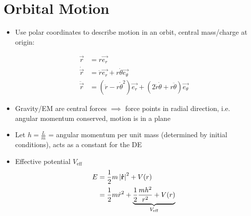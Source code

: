 \section{Orbital Motion}
\begin{itemize}
      \item Use polar coordinates to describe motion in an orbit, central mass/charge at origin:

            \begin{align*}
                  \vec{r}        & = r \vec{e_r}                                                                                             \\
                  \dot{\vec{r}}  & = \dot{r} \vec{e_r} + r \dot{\theta} \vec{e_{\theta}}                                                     \\
                  \ddot{\vec{r}} & = (\ddot{r} - r \dot{\theta}^2 ) \vec{e_r} + (2 \dot{r} \dot{\theta} + r \ddot{\theta} ) \vec{e_{\theta}}
            \end{align*}

      \item Gravity/EM are central forces $\implies$ force points in radial direction, i.e. angular momentum conserved, motion is in a plane
      \item Let $h = \frac{L}{m}$ = angular momentum per unit mass (determined by initial conditions), acts as a constant for the DE
      \item Effective potential $V_{\textrm{eff}}$
            \begin{align*}
                  E & = \frac{1}{2} m \left| \boldsymbol{\mathbf{\dot{r}}} \right|^2  + V(r)                                  \\
                    & = \frac{1}{2} m \dot{r}^2 + \underbrace{\frac{1}{2} \frac{mh^2}{r^2} + V(r)}_{
                  V_{\textrm{eff}}}
            \end{align*}


\end{itemize}
